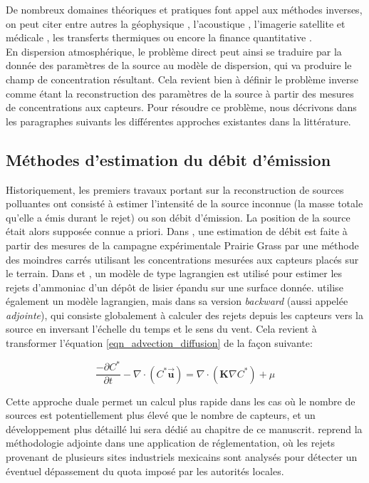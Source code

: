 	De nombreux domaines théoriques et pratiques font appel aux méthodes inverses, on peut citer entre autres la géophysique \cite{Backus1967}, l'acoustique \cite{Kirsch1988}, l'imagerie satellite \cite{Park2003} et médicale \cite{Arridge1999}, les transferts thermiques
	 \cite{McCormik1992} ou encore la finance quantitative \cite{Dembo1999}.\\
	
	En dispersion atmosphérique, le problème direct peut ainsi se traduire par la donnée des paramètres de la source au modèle de dispersion, qui va produire le champ de concentration résultant. Cela revient bien à définir le problème inverse comme étant la reconstruction des paramètres de la source à partir des mesures de concentrations aux capteurs. Pour résoudre ce problème, nous décrivons dans les paragraphes suivants les différentes approches existantes dans la littérature.\\
	
	\subsection{Méthodes d'estimation du débit d'émission}
	Historiquement, les premiers travaux portant sur la reconstruction de sources polluantes ont consisté à estimer l'intensité de la source inconnue (la masse totale qu'elle a émis durant le rejet) ou son débit d'émission. La position de la source était alors supposée connue a priori. Dans \cite{Hanna1990}, une estimation de débit est faite à partir des mesures de la campagne expérimentale Prairie Grass par une méthode des moindres carrés utilisant les concentrations mesurées aux capteurs placés sur le terrain. Dans \cite{Gordon1988} et \cite{Wilson1992}, un modèle de type lagrangien est utilisé pour estimer les rejets d'ammoniac d'un dépôt de lisier épandu sur une surface donnée. \cite{Flesch1995} utilise également un modèle lagrangien, mais dans sa version \textit{backward} (aussi appelée \textit{adjointe}), qui consiste globalement à calculer des rejets depuis les capteurs vers la source en inversant l'échelle du temps et le sens du vent. Cela revient à transformer l'équation \eqref{eqn_advection_diffusion} de la façon suivante:
	
	\begin{equation}
	\label{eqn_advection_diffusion_backward}
	\dfrac{-\partial C^*}{\partial t} - \nabla \cdot(C^*\bm{\vec{u}}) = \nabla \cdot (\bm{K}\nabla C^*) + \mu
	\end{equation}

	Cette approche duale permet un calcul plus rapide dans les cas où le nombre de sources est potentiellement plus élevé que le nombre de capteurs, et un développement plus détaillé lui sera dédié au chapitre  de ce manuscrit. \cite{Skiba2003} reprend la méthodologie adjointe dans une application de réglementation, où les rejets provenant de plusieurs sites industriels mexicains sont analysés pour détecter un éventuel dépassement du quota imposé par les autorités locales.\\
	

